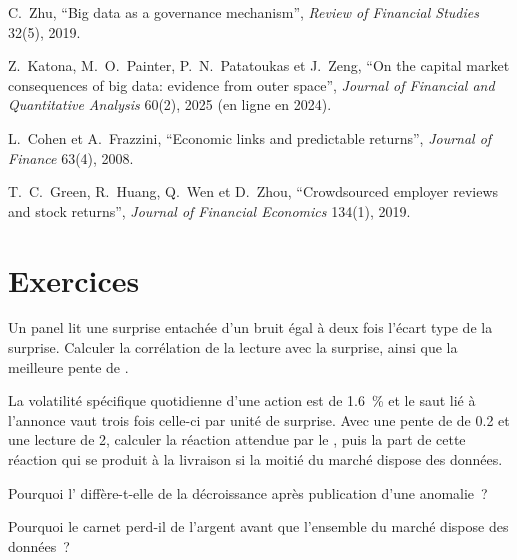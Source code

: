 \begin{omsources}
\item C.~Zhu, ``Big data as a governance mechanism'', \emph{Review of Financial Studies} 32(5), 2019.
\item Z.~Katona, M.~O.~Painter, P.~N.~Patatoukas et J.~Zeng, ``On the capital market consequences of big data: evidence from outer space'', \emph{Journal
of Financial and Quantitative Analysis} 60(2), 2025 (en ligne en 2024).
\item L.~Cohen et A.~Frazzini, ``Economic links and predictable returns'', \emph{Journal of Finance} 63(4), 2008.
\item T.~C.~Green, R.~Huang, Q.~Wen et D.~Zhou, ``Crowdsourced employer reviews and stock returns'', \emph{Journal of Financial Economics} 134(1), 2019.
\end{omsources}

\section{Exercices}

\begin{exercise}[$\star$]\label{exo:s1:alternative-data-strategies:1}
Un panel lit une surprise entachée d'un bruit égal à deux fois l'écart type de la surprise. Calculer la corrélation de la lecture avec la surprise, ainsi que la meilleure pente de .
\end{exercise}

\begin{exercise}[$\star$]\label{exo:s1:alternative-data-strategies:2}
La volatilité spécifique quotidienne d'une action est de 1.6~\% et le saut lié à l'annonce vaut trois fois celle-ci par unité de surprise. Avec une pente de  de 0.2 et une lecture de 2,
calculer la réaction attendue par le , puis la part de cette réaction qui se produit à la livraison si la moitié du marché dispose des données.
\end{exercise}

\begin{exercise}[$\star$]\label{exo:s1:alternative-data-strategies:3}
Pourquoi l' diffère-t-elle de la décroissance après publication d'une anomalie~?
\end{exercise}

\begin{exercise}[$\star\star$]\label{exo:s1:alternative-data-strategies:4}
Pourquoi le carnet perd-il de l'argent avant que l'ensemble du marché dispose des données~?
\end{exercise}

